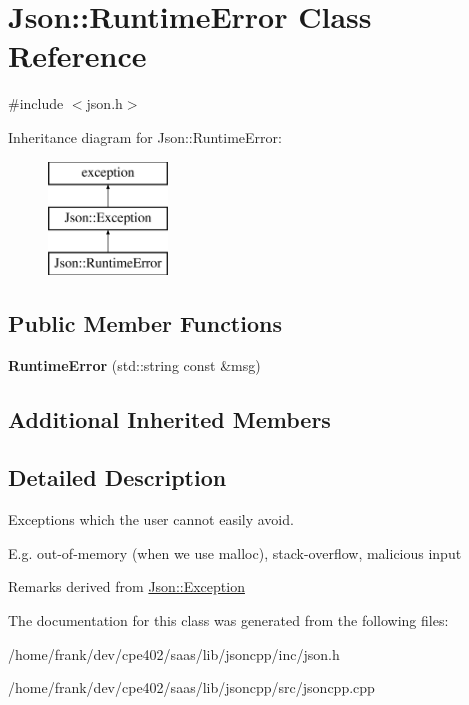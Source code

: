 \hypertarget{class_json_1_1_runtime_error}{}\section{Json\+:\+:Runtime\+Error Class Reference}
\label{class_json_1_1_runtime_error}


{\ttfamily \#include $<$json.\+h$>$}

Inheritance diagram for Json\+:\+:Runtime\+Error\+:\begin{figure}[H]
\begin{center}
\leavevmode
\includegraphics[height=3.000000cm]{class_json_1_1_runtime_error}
\end{center}
\end{figure}
\subsection*{Public Member Functions}
\begin{DoxyCompactItemize}
\item 
\hypertarget{class_json_1_1_runtime_error_ae4f102d5c1efb773887efc8c7911e6f8}{}{\bfseries Runtime\+Error} (std\+::string const \&msg)\label{class_json_1_1_runtime_error_ae4f102d5c1efb773887efc8c7911e6f8}

\end{DoxyCompactItemize}
\subsection*{Additional Inherited Members}


\subsection{Detailed Description}
Exceptions which the user cannot easily avoid.

E.\+g. out-\/of-\/memory (when we use malloc), stack-\/overflow, malicious input

\begin{DoxyRemark}{Remarks}
derived from \hyperlink{class_json_1_1_exception}{Json\+::\+Exception} 
\end{DoxyRemark}


The documentation for this class was generated from the following files\+:\begin{DoxyCompactItemize}
\item 
/home/frank/dev/cpe402/saas/lib/jsoncpp/inc/json.\+h\item 
/home/frank/dev/cpe402/saas/lib/jsoncpp/src/jsoncpp.\+cpp\end{DoxyCompactItemize}
